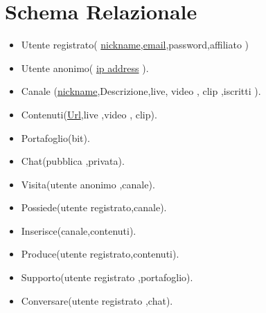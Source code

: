 \section*{Schema Relazionale}
\begin{itemize}
    \item Utente registrato( \underline{nickname},\underline{email},password,affiliato  )
    \item Utente anonimo( \underline{ip address} ).
    \item Canale (\underline{nickname},Descrizione,live, video , clip ,iscritti ).
    \item Contenuti(\underline{Url},live ,video , clip).
    \item Portafoglio(bit). 
    \item Chat(pubblica ,privata). 
    \item Visita(utente anonimo ,canale).
    \item Possiede(utente registrato,canale).
    \item Inserisce(canale,contenuti).
    \item Produce(utente registrato,contenuti).
    \item Supporto(utente registrato ,portafoglio).
    \item Conversare(utente registrato ,chat).
\end{itemize}